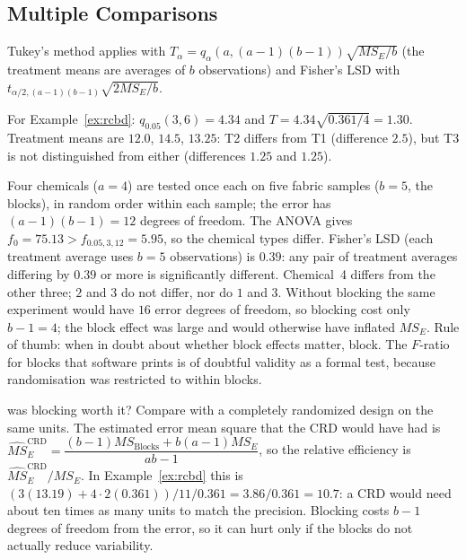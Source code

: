 \subsection{Multiple Comparisons}

Tukey's method applies with $T_\alpha=q_\alpha(a,(a-1)(b-1))\sqrt{MS_E/b}$ (the treatment means are averages of $b$ observations) and Fisher's LSD with $t_{\alpha/2,(a-1)(b-1)}\sqrt{2MS_E/b}$.

\begin{example}
For Example~\ref{ex:rcbd}: $q_{0.05}(3,6)=4.34$ and $T=4.34\sqrt{0.361/4}=1.30$. Treatment means are $12.0$, $14.5$, $13.25$: T2 differs from T1 (difference $2.5$), but T3 is not distinguished from either (differences $1.25$ and $1.25$).
\end{example}

\begin{example}
Four chemicals ($a=4$) are tested once each on five fabric samples ($b=5$, the blocks), in random order within each sample; the error has $(a-1)(b-1)=12$ degrees of freedom. The ANOVA gives $f_0=75.13>f_{0.05,3,12}=5.95$, so the chemical types differ. Fisher's LSD (each treatment average uses $b=5$ observations) is $0.39$: any pair of treatment averages differing by $0.39$ or more is significantly different. Chemical~4 differs from the other three; $2$ and $3$ do not differ, nor do $1$ and $3$. Without blocking the same experiment would have $16$ error degrees of freedom, so blocking cost only $b-1=4$; the block effect was large and would otherwise have inflated $MS_E$. Rule of thumb: when in doubt about whether block effects matter, block. The $F$-ratio for blocks that software prints is of doubtful validity as a formal test, because randomisation was restricted to within blocks.
\end{example}

\begin{interview}{was blocking worth it?}
Compare with a completely randomized design on the same units. The estimated error mean square that the CRD would have had is $\widehat{MS}_E^{\mathrm{CRD}}=\dfrac{(b-1)MS_{\mathrm{Blocks}}+b(a-1)MS_E}{ab-1}$, so the relative efficiency is $\widehat{MS}_E^{\mathrm{CRD}}/MS_E$. In Example~\ref{ex:rcbd} this is $(3(13.19)+4\cdot2(0.361))/11\big/0.361=3.86/0.361=10.7$: a CRD would need about ten times as many units to match the precision. Blocking costs $b-1$ degrees of freedom from the error, so it can hurt only if the blocks do not actually reduce variability.
\end{interview}

